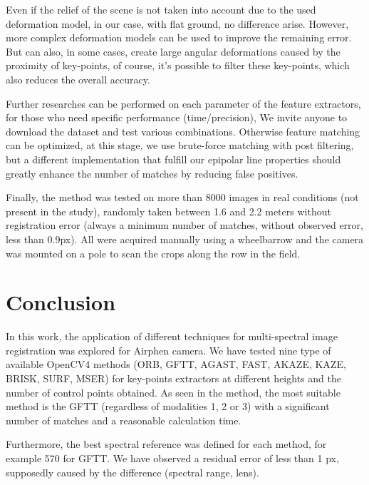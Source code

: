 \documentclass[]{elsarticle}
\begin{document}
	\par Even if the relief of the scene is not taken into account due to the used deformation model,
	in our case, with flat ground, no difference arise.
	However, more complex deformation models \cite{Lombaert, ThinPlateSpline} can be used to improve the remaining error.
	But can also, in some cases, create large angular deformations caused by the proximity of key-points,
	of course, it's possible to filter these key-points, which also reduces the overall accuracy.
	\\
	\par Further researches can be performed on each parameter of the feature extractors, for those who need specific performance (time/precision),
	We invite anyone to download the dataset and test various combinations.
	Otherwise feature matching can be optimized, at this stage, we use brute-force matching with post filtering,
	but a different implementation that fulfill our epipolar line properties should greatly enhance the number of matches by reducing false positives.
	\\
	\par Finally, the method was tested on more than 8000 images in real conditions (not present in the study),
	randomly taken between 1.6 and 2.2 meters without registration error (always a minimum number of matches, without observed error, less than $0.9$px).
	All were acquired manually using a wheelbarrow and the camera was mounted on a pole to scan the crops along the row in the field.
	
	
	\section{Conclusion}
	
	\par In this work, the application of different techniques for multi-spectral image registration was explored for Airphen camera.
	We have tested nine type of available OpenCV4 methods (ORB, GFTT, AGAST, FAST, AKAZE, KAZE, BRISK, SURF, MSER)
	for key-points extractors at different heights and the number of control points obtained.
	As seen in the method, the most suitable method is the GFTT (regardless of modalities 1, 2 or 3)
	with a significant number of matches and a reasonable calculation time.
	\\
	\par Furthermore, the best spectral reference was defined for each method, for example 570 for GFTT.
	We have observed a residual error of less than 1 px, supposedly caused by the difference (spectral range, lens).
	
\end{document}
